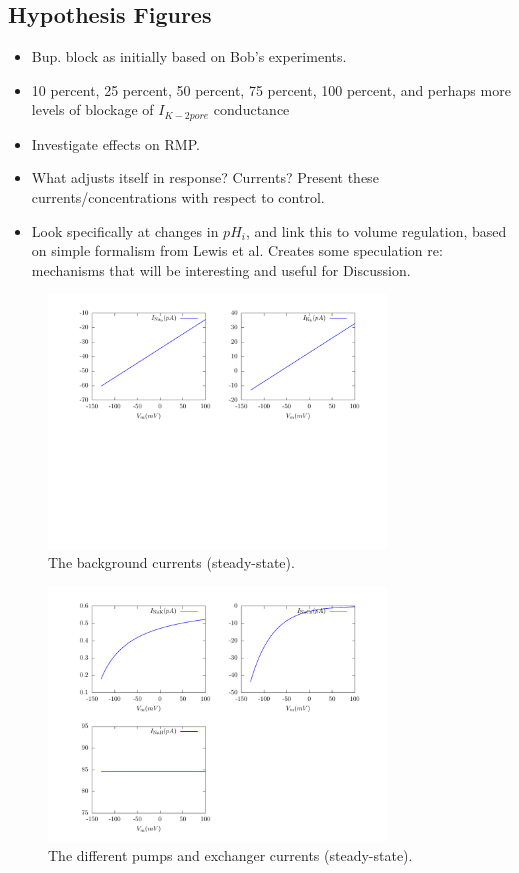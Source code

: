 \subsection{Hypothesis Figures}
\begin{itemize}
\item Bup. block as initially based on Bob's experiments.
\item 10 percent, 25 percent, 50 percent, 75 percent, 100 percent, and
  perhaps more levels of blockage of $I_{K-2pore}$ conductance
\item Investigate effects on RMP.
\item What adjusts itself in response? Currents? Present these
    currents/concentrations with respect to control.
\item Look specifically at changes in $pH_i$, and link this to volume
  regulation, based on simple formalism from Lewis et al. Creates some
  speculation re: mechanisms that will be interesting and useful for
  Discussion.
\end{itemize}

\begin{figure}
  \centering
  \includegraphics[width=0.8\textwidth]
  {../results/pdf/20110506/background_currents-vi}
  \caption{The background currents (steady-state).}
  \label{fig:background-currents-vi}
\end{figure}

\begin{figure}
  \centering
  \includegraphics[width=0.8\textwidth]
  {../results/pdf/20110506/pumps_and_exchangers-vi}
  \caption{The different pumps and exchanger currents (steady-state).}
  \label{fig:pumps-and-exchangers-vi}
\end{figure}

